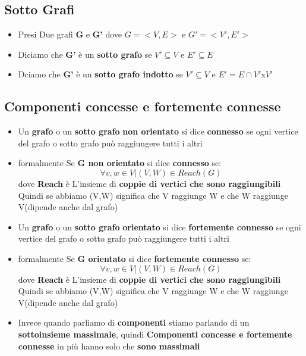 \subsection{Sotto Grafi}
\begin{itemize}
    \item Presi Due grafi \textbf{G} e \textbf{G'} dove $G = <V,E>$ e $G'=<V',E'>$
    \item Diciamo che \textbf{G'} è un \textbf{sotto grafo} se $V' \subseteq V$ e $ E' \subseteq E$
    \item Dciamo che \textbf{G'} è un \textbf{sotto grafo indotto} se $V' \subseteq V$ e $ E' = E \cap V'$x$V'$
\end{itemize}

\subsection{Componenti concesse e fortemente connesse}
\begin{itemize}
    \item Un \textbf{grafo} o un \textbf{sotto grafo} \textbf{non orientato} si dice \textbf{connesso} se ogni vertice del grafo o sotto grafo può raggiungere tutti i altri 
    \item formalmente Se \textbf{G non orientato} si dice \textbf{connesso} se: \newline \[\forall v,w \in V | (V,W) \in Reach(G)\] \newline dove \textbf{Reach} è L'insieme di \textbf{coppie di vertici che sono raggiungibili } Quindi se abbiamo (V,W) significa che V raggiunge W e che W raggiunge V(dipende anche dal grafo)

    \item Un \textbf{grafo} o un \textbf{sotto grafo} \textbf{orientato} si dice \textbf{fortemente connesso} se ogni vertice del grafo o sotto grafo può raggiungere tutti i altri 
    \item formalmente Se \textbf{G orientato} si dice \textbf{fortemente connesso} se: \newline \[\forall v,w \in V | (V,W) \in Reach(G)\] \newline dove \textbf{Reach} è L'insieme di \textbf{coppie di vertici che sono raggiungibili } Quindi se abbiamo (V,W) significa che V raggiunge W e che W raggiunge V(dipende anche dal grafo)
    \item  Invece quando parliamo di \textbf{componenti} stiamo parlando di un \textbf{sottoinsieme massimale}, quindi \textbf{Componenti concesse e fortemente connesse} in più hanno solo che \textbf{sono massimali} 
\end{itemize}

